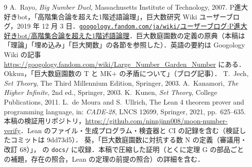 \documentclass[a4paper,11pt]{ltjsarticle}
\theoremstyle{plain}
\theoremstyle{definition}
\newcommand{\file}[1]{\texttt{#1}}
\begin{document}
\begin{thebibliography}{9}
 A.~Rayo, \emph{Big Number Duel}, Massachusetts Institute of Technology, 2007.
 P進大好きbot，「高階集合論を超えた1階述語論理」，巨大数研究 Wiki ユーザーブログ，2019 年 12 月 3 日．\href{https://googology.fandom.com/ja/wiki/%E3%83%A6%E3%83%BC%E3%82%B6%E3%83%BC%E3%83%96%E3%83%AD%E3%82%B0:P%E9%80%B2%E5%A4%A7%E5%A5%BD%E3%81%8Dbot/%E9%AB%98%E9%9A%8E%E9%9B%86%E5%90%88%E8%AB%96%E3%82%92%E8%B6%85%E3%81%88%E3%81%9F1%E9%9A%8E%E8%BF%B0%E8%AA%9E%E8%AB%96%E7%90%86}{\nolinkurl{googology.fandom.com/ja/wiki/}ユーザーブログ:P進大好きbot/高階集合論を超えた1階述語論理}．巨大数庭園数の定義の原典（本稿は「理論」「埋め込み」「巨大関数」の各節を参照した）．英語の要約は Googology Wiki の記事 \url{https://googology.fandom.com/wiki/Large_Number_Garden_Number} にある．
 Okkuu，「巨大数庭園数の T と MK+ の矛盾について」（ブログ記事）．
 T.~Jech, \emph{Set Theory}, The Third Millennium Edition, Springer, 2003.
 A.~Kanamori, \emph{The Higher Infinite}, 2nd ed., Springer, 2003.
 K.~Kunen, \emph{Set Theory}, College Publications, 2011.
 L.~de Moura and S.~Ullrich, The Lean 4 theorem prover and programming language, in: \emph{CADE-28}, LNCS 12699, Springer, 2021, pp.~625--635.
 本稿の検証用リポジトリ，\url{https://github.com/ninnjinn008/moon-number-verify}．Lean のファイル・生成プログラム・検査器と CI の記録を含む（検証したコミットは 9dd73d5）．
 葵，「巨大数庭園数に対抗する数 N の定義（審議用・改訂 68）」，\cite{repo} の \file{docs/} に収録．本稿で圧縮した証明（とくに定理 G の部品ごとの補題，存在の照合，Lean の定理の前提の照合）の詳細を含む．
\end{thebibliography}
\end{document}
